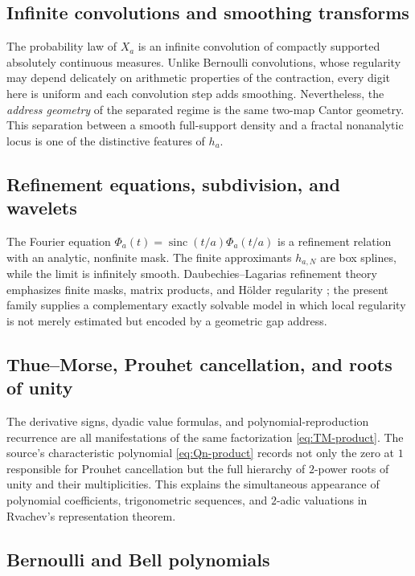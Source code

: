 \documentclass[11pt,oneside]{article}
\theoremstyle{definition}
\theoremstyle{remark}
\newcommand{\sinc}{\operatorname{sinc}}
\begin{document}
\subsection{Infinite convolutions and smoothing transforms}

The probability law of $X_a$ is an infinite convolution of compactly supported absolutely
continuous measures.  Unlike Bernoulli convolutions, whose regularity may depend delicately on
arithmetic properties of the contraction, every digit here is uniform and each convolution
step adds smoothing.  Nevertheless, the \emph{address geometry} of the separated regime is
the same two-map Cantor geometry.  This separation between a smooth full-support density and
a fractal nonanalytic locus is one of the distinctive features of $h_a$.

\subsection{Refinement equations, subdivision, and wavelets}

The Fourier equation
$\Phi_a(t)=\sinc(t/a)\Phi_a(t/a)$ is a refinement relation with an analytic, nonfinite mask.
The finite approximants $h_{a,N}$ are box splines, while the limit is infinitely smooth.
Daubechies--Lagarias refinement theory emphasizes finite masks, matrix products, and Hölder
regularity \cite{daubechieslagarias1,daubechieslagarias2}; the present family supplies a
complementary exactly solvable model in which local regularity is not merely estimated but
encoded by a geometric gap address.

\subsection{Thue--Morse, Prouhet cancellation, and roots of unity}

The derivative signs, dyadic value formulas, and polynomial-reproduction recurrence are all
manifestations of the same factorization \eqref{eq:TM-product}.  The source's characteristic
polynomial \eqref{eq:Qn-product} records not only the zero at $1$ responsible for Prouhet
cancellation but the full hierarchy of $2$-power roots of unity and their multiplicities.
This explains the simultaneous appearance of polynomial coefficients, trigonometric
sequences, and $2$-adic valuations in Rvachev's representation theorem.

\subsection{Bernoulli and Bell polynomials}
\end{document}
